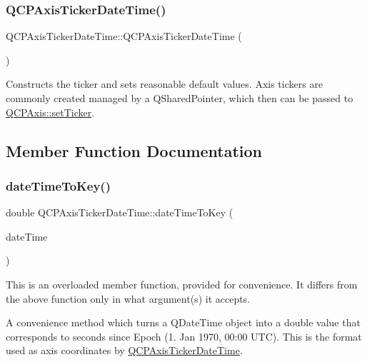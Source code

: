 \subsubsection{\texorpdfstring{Q\+C\+P\+Axis\+Ticker\+Date\+Time()}{QCPAxisTickerDateTime()}}
{\footnotesize\ttfamily Q\+C\+P\+Axis\+Ticker\+Date\+Time\+::\+Q\+C\+P\+Axis\+Ticker\+Date\+Time (\begin{DoxyParamCaption}{ }\end{DoxyParamCaption})}

Constructs the ticker and sets reasonable default values. Axis tickers are commonly created managed by a Q\+Shared\+Pointer, which then can be passed to \hyperlink{class_q_c_p_axis_a4ee03fcd2c74d05cd1a419b9af5cfbdc}{Q\+C\+P\+Axis\+::set\+Ticker}. 

\subsection{Member Function Documentation}
\mbox{\label{class_q_c_p_axis_ticker_date_time_aa24f293f16fff0f937bf71f4140033f1}} 
\subsubsection{\texorpdfstring{date\+Time\+To\+Key()}{dateTimeToKey()}\hspace{0.1cm}{\footnotesize\ttfamily [1/2]}}
{\footnotesize\ttfamily double Q\+C\+P\+Axis\+Ticker\+Date\+Time\+::date\+Time\+To\+Key (\begin{DoxyParamCaption}\item[{const Q\+Date\+Time}]{date\+Time }\end{DoxyParamCaption})\hspace{0.3cm}{\ttfamily [static]}}

This is an overloaded member function, provided for convenience. It differs from the above function only in what argument(s) it accepts.

A convenience method which turns a Q\+Date\+Time object into a double value that corresponds to seconds since Epoch (1. Jan 1970, 00\+:00 U\+TC). This is the format used as axis coordinates by \hyperlink{class_q_c_p_axis_ticker_date_time}{Q\+C\+P\+Axis\+Ticker\+Date\+Time}.

